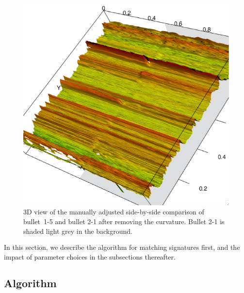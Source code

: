 \documentclass[aoas, preprint]{imsart}\usepackage[]{graphicx}\usepackage[]{color}
\begin{document}
\begin{figure}[hbtp]
\centering
\includegraphics[width=.65\columnwidth]{images/matchup-rgl-copy.png}
\caption{\label{fig:manualmatch-rgl}3D view of the manually adjusted side-by-side comparison of bullet~1-5 and bullet 2-1 after removing the curvature. Bullet 2-1 is shaded light grey in the background.}
\end{figure}

In this section, we describe the algorithm for matching signatures first, and the impact of parameter choices in the subsections thereafter.

\subsection{Algorithm}\label{sec:algorithm}
\end{document}
